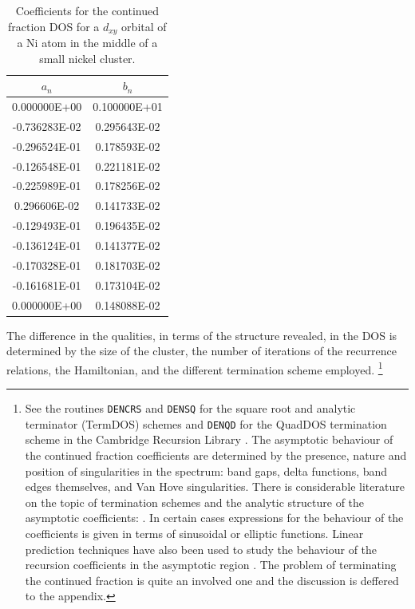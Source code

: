 \begin{table}
\begin{center}
\begin{tabular}{|c|c|}
\hline
$a_{n}$ & $b_{n}$ \\
\hline
 0.000000E+00 & 0.100000E+01\\
-0.736283E-02 & 0.295643E-02\\
-0.296524E-01 & 0.178593E-02\\
-0.126548E-01 & 0.221181E-02\\
-0.225989E-01 & 0.178256E-02\\
 0.296606E-02 & 0.141733E-02\\
-0.129493E-01 & 0.196435E-02\\
-0.136124E-01 & 0.141377E-02\\
-0.170328E-01 & 0.181703E-02\\
-0.161681E-01 & 0.173104E-02\\
 0.000000E+00 & 0.148088E-02\\
\hline
\end{tabular}
\caption{Coefficients for the continued fraction DOS for a $d_{xy}$ orbital of a Ni 
atom in the middle of a small nickel cluster.\label{tab:reccoeffs}}
\end{center}
\end{table}

The difference in the qualities, in terms of the structure revealed, in the DOS 
is determined by the size of the cluster, the number of iterations of the
recurrence relations, the Hamiltonian, and the different termination 
scheme employed. 
\footnote{See the routines \texttt{DENCRS} and \texttt{DENSQ} 
for the square root and analytic terminator (TermDOS) schemes and \texttt{DENQD} 
for the QuadDOS termination scheme in the Cambridge Recursion Library 
\cite{nex84,haydock84,haydock85}.
The asymptotic behaviour of the continued fraction coefficients 
are determined by the presence, nature and position of singularities
in the spectrum: band gaps, delta functions,
band edges themselves, and Van Hove singularities.
There is considerable literature on the topic of termination schemes 
and the analytic structure of the asymptotic coefficients:
\cite{hodges77,bylander80,turchi82,haydock84,luchini87,glanville88,
yoshino87,yoshino88,haydock89,haydock10,alhaidari18}.
In certain cases expressions for the behaviour of the coefficients
is given in terms of sinusoidal or elliptic functions. Linear prediction techniques
have also been used to study the behaviour of the recursion coefficients in the
asymptotic region \cite{allan84}. The problem of terminating the continued fraction
is quite an involved one and the discussion is deffered to the appendix.}

